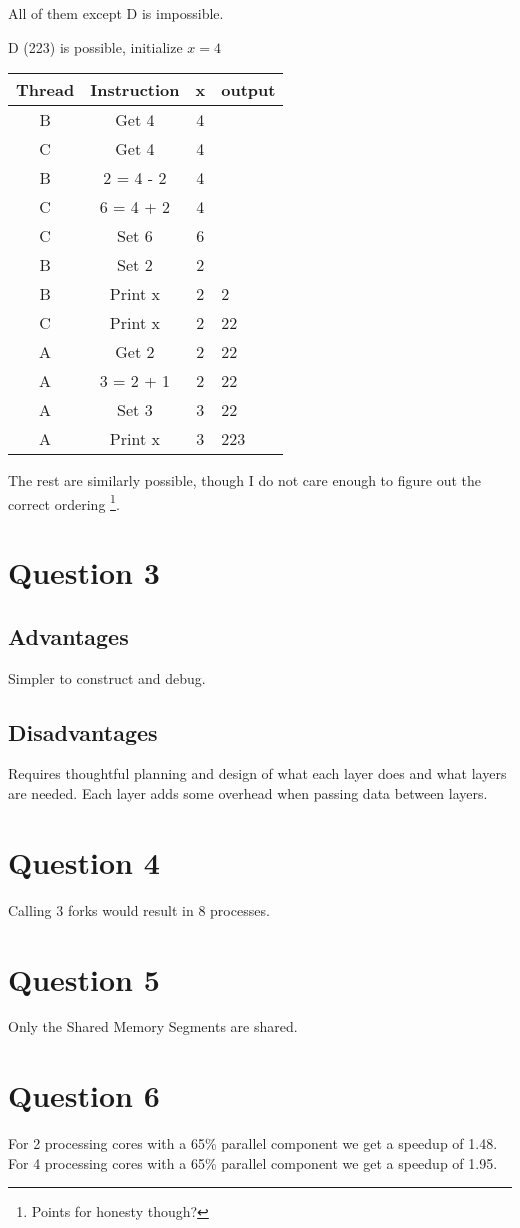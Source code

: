 \documentclass{article}
\begin{document}
All of them except D is impossible.

D (223) is possible, initialize \(x = 4\)

\begin{tabular}{c|c|c|l}
    Thread & Instruction & x & output \\
    \hline
    B      & Get 4       & 4 &        \\
    C      & Get 4       & 4 &        \\
    B      & 2 = 4 - 2   & 4 &        \\
    C      & 6 = 4 + 2   & 4 &        \\
    C      & Set 6       & 6 &        \\
    B      & Set 2       & 2 &        \\
    B      & Print x     & 2 & 2      \\
    C      & Print x     & 2 & 22     \\
    A      & Get 2       & 2 & 22     \\
    A      & 3 = 2 + 1   & 2 & 22     \\
    A      & Set 3       & 3 & 22     \\
    A      & Print x     & 3 & 223    \\
\end{tabular}

The rest are similarly possible, though I do not care enough to figure out the
correct ordering \footnote{Points for honesty though?}.

\section*{Question 3}
\subsection*{Advantages}
Simpler to construct and debug.

\subsection*{Disadvantages}
Requires thoughtful planning and design of what each layer does and what layers are needed.
Each layer adds some overhead when passing data between layers.

\section*{Question 4}
Calling 3 forks would result in 8 processes.

\section*{Question 5}
Only the Shared Memory Segments are shared.

\section*{Question 6}
For 2 processing cores with a 65\% parallel component we get a speedup of 1.48.
For 4 processing cores with a 65\% parallel component we get a speedup of 1.95.
\end{document}
